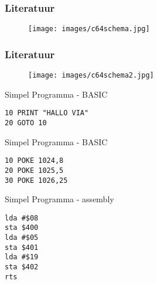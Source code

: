 \documentclass[aspectratio=43]{uva-inf-presentation}
\begin{document}

\begin{frame}
\frametitle{Literatuur}

\begin{figure}
\texttt{[image: images/c64schema.jpg]}
\end{figure}

\end{frame}


\begin{frame}
\frametitle{Literatuur}

\begin{figure}
\texttt{[image: images/c64schema2.jpg]}
\end{figure}

\end{frame}


\begin{frame}[fragile]{Simpel Programma - BASIC}

\begin{lstlisting}
10 PRINT "HALLO VIA"
20 GOTO 10
\end{lstlisting}

\end{frame}


\begin{frame}[fragile]{Simpel Programma - BASIC}

\begin{lstlisting}
10 POKE 1024,8
20 POKE 1025,5
30 POKE 1026,25
\end{lstlisting}

\end{frame}


\begin{frame}[fragile]{Simpel Programma - assembly}

\begin{lstlisting}
lda #$08
sta $400
lda #$05
sta $401
lda #$19
sta $402
rts
\end{lstlisting}

\end{frame}

\end{document}
